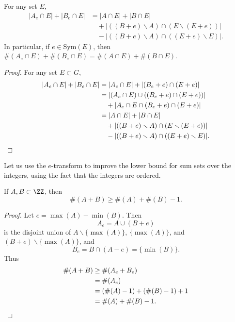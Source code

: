 \begin{lemma}
    For any set $E$,
    \begin{align*}
        |A_e \cap E| + |B_e \cap E| &= |A \cap E| + |B \cap E|\\
        &\quad + |((B + e) \smallsetminus A) \cap (E \smallsetminus (E + e))|\\
        &\quad - |((B + e) \smallsetminus A) \cap ((E + e) \smallsetminus E)|.
    \end{align*}
    In particular, if $e \in \text{Sym}(E)$, then $\#(A_e \cap E) + \#(B_e \cap E) = \#(A \cap E) + \#(B \cap E)$.
\end{lemma}
\begin{proof}
    For any set $E \subset G$,
    \begin{align*}
        |A_e \cap E| + |B_e \cap E| &= |A_e \cap E| + |(B_e + e) \cap (E + e)|\\
        &= |(A_e \cap E) \cup ((B_e + e) \cap (E + e))|\\
        &\quad + |A_e \cap E \cap (B_e + e) \cap (E + e)|\\
        &= |A \cap E| + |B \cap E|\\
        &\quad + |((B + e) \smallsetminus A) \cap (E \smallsetminus (E + e))|\\
        &\quad - |((B + e) \smallsetminus A) \cap ((E + e) \smallsetminus E)|. \qedhere
    \end{align*}
\end{proof}

Let us use the $e$-transform to improve the lower bound for sum sets over the integers, using the fact that the integers are ordered.

\begin{lemma}
    If $A,B \subset \ZZ$, then
    \[ \#(A + B) \geq \#(A) + \#(B) - 1. \]
\end{lemma}
\begin{proof}
    Let $e = \max(A) - \min(B)$. Then
    \[ A_e = A \cup (B + e) \]
    is the disjoint union of $A \smallsetminus \{ \max(A) \}$, $\{ \max(A) \}$, and $(B + e) \smallsetminus \{ \max(A) \}$, and
    \[ B_e = B \cap (A - e) = \{ \min(B) \}. \]
    Thus
    \begin{align*}
        \#(A + B) &\geq \#(A_e + B_e)\\
        &= \#(A_e)\\
        &= (\#(A) - 1) + (\#(B) - 1) + 1\\
        &= \#(A) + \#(B) - 1. \qedhere
    \end{align*}
\end{proof}

